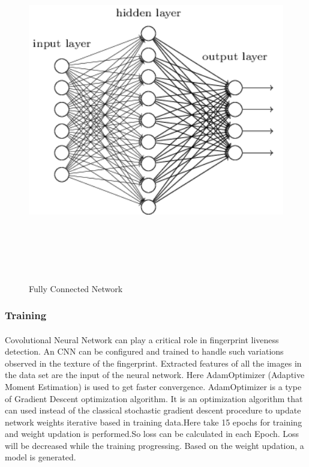 \documentclass[a4paper,12pt,oneside]{article}
\begin{document}
\begin{figure}[H]
\centering
\includegraphics[height=15cm,width=12cm]{fullconn.png}
\caption{Fully Connected Network} 
\end{figure}


\subsubsection{Training}
\paragraph{}
 Covolutional Neural Network can play a critical role in fingerprint liveness detection. An CNN can be configured and trained to handle such variations observed in the texture of the fingerprint. Extracted features of all the images in the data set are the input
of the neural network.
Here AdamOptimizer (Adaptive Moment Estimation) is used to get faster convergence.
AdamOptimizer is a type of Gradient Descent optimization algorithm. It is an optimization
algorithm that can used instead of the classical stochastic gradient descent procedure to update
network weights iterative based in training data.Here take 15 epochs for training and weight updation is performed.So loss can be calculated in each Epoch. Loss will be decreased while the training progressing. Based on the weight updation, a model is generated.
\end{document}
